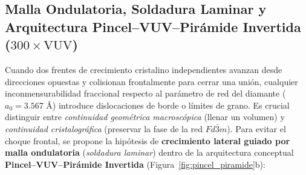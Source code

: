 \documentclass[10pt,twocolumn,a4paper]{article}
\begin{document}
\subsection{Malla Ondulatoria, Soldadura Laminar y Arquitectura Pincel--VUV--Pirámide Invertida ($300\times\text{VUV}$)}
Cuando dos frentes de crecimiento cristalino independientes avanzan desde direcciones opuestas y colisionan frontalmente para cerrar una unión, cualquier inconmensurabilidad fraccional respecto al parámetro de red del diamante ($a_0 = 3.567\text{ \AA}$) introduce dislocaciones de borde o límites de grano. Es crucial distinguir entre \textit{continuidad geométrica macroscópica} (llenar un volumen) y \textit{continuidad cristalográfica} (preservar la fase de la red $Fd\bar{3}m$). Para evitar el choque frontal, se propone la hipótesis de \textbf{crecimiento lateral guiado por malla ondulatoria} (\textit{soldadura laminar}) dentro de la arquitectura conceptual \textbf{Pincel--VUV--Pirámide Invertida} (Figura~\ref{fig:pincel_piramide}b):
\end{document}
